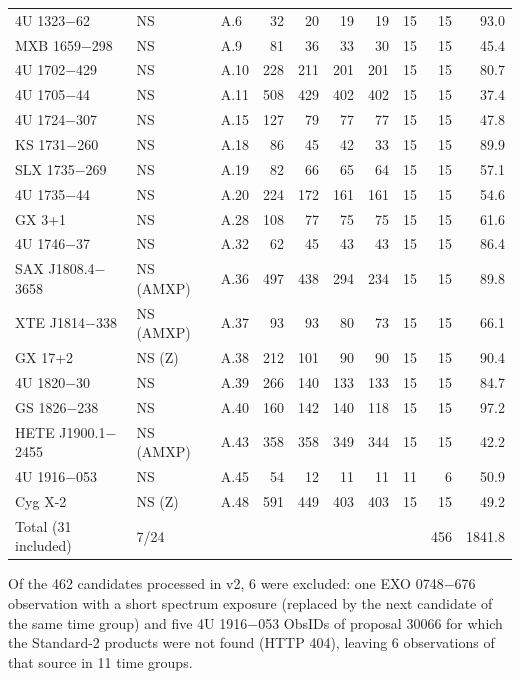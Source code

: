 {\begin{longtable}{@{}lllrrrrrrr@{}}
4U 1323$-$62 & NS & A.6 & 32 & 20 & 19 & 19 & 15 & 15 & 93.0 \\
MXB 1659$-$298 & NS & A.9 & 81 & 36 & 33 & 30 & 15 & 15 & 45.4 \\
4U 1702$-$429 & NS & A.10 & 228 & 211 & 201 & 201 & 15 & 15 & 80.7 \\
4U 1705$-$44 & NS & A.11 & 508 & 429 & 402 & 402 & 15 & 15 & 37.4 \\
4U 1724$-$307 & NS & A.15 & 127 & 79 & 77 & 77 & 15 & 15 & 47.8 \\
KS 1731$-$260 & NS & A.18 & 86 & 45 & 42 & 33 & 15 & 15 & 89.9 \\
SLX 1735$-$269 & NS & A.19 & 82 & 66 & 65 & 64 & 15 & 15 & 57.1 \\
4U 1735$-$44 & NS & A.20 & 224 & 172 & 161 & 161 & 15 & 15 & 54.6 \\
GX 3+1 & NS & A.28 & 108 & 77 & 75 & 75 & 15 & 15 & 61.6 \\
4U 1746$-$37 & NS & A.32 & 62 & 45 & 43 & 43 & 15 & 15 & 86.4 \\
SAX J1808.4$-$3658 & NS (AMXP) & A.36 & 497 & 438 & 294 & 234 & 15 & 15 & 89.8 \\
XTE J1814$-$338 & NS (AMXP) & A.37 & 93 & 93 & 80 & 73 & 15 & 15 & 66.1 \\
GX 17+2 & NS (Z) & A.38 & 212 & 101 & 90 & 90 & 15 & 15 & 90.4 \\
4U 1820$-$30 & NS & A.39 & 266 & 140 & 133 & 133 & 15 & 15 & 84.7 \\
GS 1826$-$238 & NS & A.40 & 160 & 142 & 140 & 118 & 15 & 15 & 97.2 \\
HETE J1900.1$-$2455 & NS (AMXP) & A.43 & 358 & 358 & 349 & 344 & 15 & 15 & 42.2 \\
4U 1916$-$053 & NS & A.45 & 54 & 12 & 11 & 11 & 11 & 6 & 50.9 \\
Cyg X-2 & NS (Z) & A.48 & 591 & 449 & 403 & 403 & 15 & 15 & 49.2 \\
\midrule
Total (31 included) & 7/24 & & & & & & & 456 & 1841.8 \\
\end{longtable}}

Of the 462 candidates processed in v2, 6 were excluded: one EXO 0748$-$676 observation with a short spectrum exposure
(replaced by the next candidate of the same time group) and five 4U 1916$-$053 ObsIDs of proposal 30066 for which the
Standard-2 products were not found (HTTP 404), leaving 6 observations of that source in 11 time groups.


